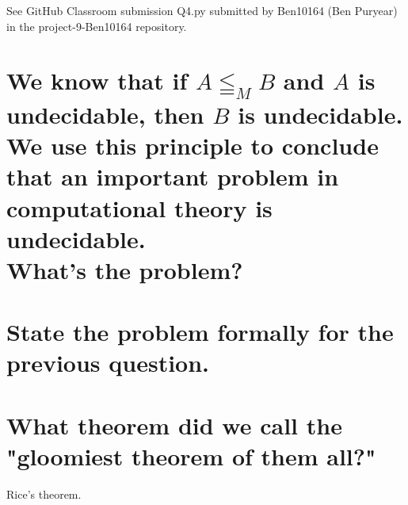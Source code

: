 \documentclass{article}
\begin{document}
See GitHub Classroom submission Q4.py submitted by Ben10164 (Ben Puryear) in the project-9-Ben10164 repository.

\section{We know that if $A \leqq_M B$ and $A$ is undecidable, then $B$ is undecidable. We use this principle to conclude that an important problem in computational theory is undecidable.\\What's the problem?}

\section{State the problem formally for the previous question.}

\section{What theorem did we call the "gloomiest theorem of them all?"}

Rice's theorem.
\end{document}
